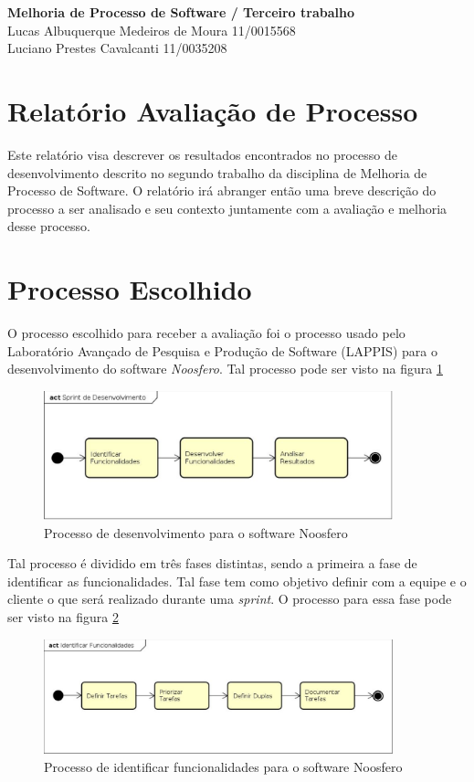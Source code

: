 \documentclass[a4paper, 11pt]{article}
\begin{document}
\noindent
\large\textbf{Melhoria de Processo de Software / Terceiro trabalho}\\
Lucas Albuquerque Medeiros de Moura \hfill 11/0015568 \\
Luciano Prestes Cavalcanti \hfill 11/0035208

\section*{Relatório Avaliação de Processo}

Este relatório visa descrever os resultados encontrados no processo de
desenvolvimento descrito no segundo trabalho da disciplina de Melhoria de
Processo de Software. O relatório irá abranger então uma breve descrição do
processo a ser analisado e seu contexto juntamente com a avaliação e melhoria
desse processo.

\section*{Processo Escolhido}

O processo escolhido para receber a avaliação foi o processo usado pelo
Laboratório Avançado de Pesquisa e Produção de Software (LAPPIS) para o
desenvolvimento do software \textit{Noosfero}. Tal processo pode ser visto na
figura \ref{fig:processo_noosfero}

\begin{figure}[h]
  \centering
  \includegraphics[width=0.9\textwidth]{figuras/processo_mps.eps}
  \caption{Processo de desenvolvimento para o software Noosfero}
  \label{fig:processo_noosfero}
\end{figure}

Tal processo é dividido em três fases distintas, sendo a primeira a fase de
identificar as funcionalidades. Tal fase tem como objetivo definir com a equipe
e o cliente o que será realizado durante uma \textit{sprint}. O processo para
essa fase pode ser visto na figura \ref{fig:processo_noosfero_funcionalidade}

\begin{figure}[h]
  \centering
  \includegraphics[width=0.9\textwidth]{figuras/processo_mps_funcionalidades.eps}
  \caption{Processo de identificar funcionalidades para o software Noosfero}
  \label{fig:processo_noosfero_funcionalidade}
\end{figure}
\end{document}
